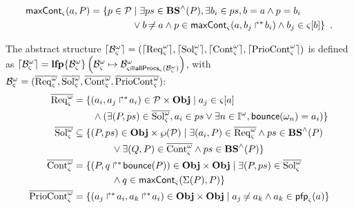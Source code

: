 \begin{definition}[$\gCont_\ctx : \Sigma \times \Obj \mapsto \powerset(\Proc)$]
  \label{def:maxCont}
  \begin{align*}
    \mathsf{maxCont}_\varsigma(a,P) = 
    \{ p \in \mathcal{P} &\mid \exists ps \in \mathbf{BS}^\wedge(P), \exists b_i \in ps, b = a \wedge p = b_i \\
      & \vee b \not\nobreak\mkern -2mu = a \wedge p \in \mathsf{maxCont}_\varsigma(a, \mbox{$b_j\Rsh^*\!b_i$}) \wedge b_j \in {\varsigma[b]} \}
    \enspace.
  \end{align*}
\end{definition}

\begin{definition}
  \label{def:aS}
  The abstract structure $\lceil \mathcal{B}_\varsigma^\omega\rceil=(\lceil \mathrm{Req}^\omega_\varsigma\rceil,\lceil \mathrm{Sol}^\omega_\varsigma\rceil,\lceil \mathrm{Cont}^\omega_\varsigma\rceil,\lceil \mathrm{PrioCont}^\omega_\varsigma\rceil)$ is defined as
  $
  \lceil \mathcal{B}_\varsigma^\omega\rceil = \mathbf{lfp}\{\mathcal{B}^\omega_\varsigma\}\left(\mathcal{B}^\omega_\varsigma\mapsto\mathcal{B}^\omega_{\varsigma \Cap \mathsf{allProcs}_\varsigma(\mathcal{B}^\omega_\varsigma)}\right)
  $,
  with $\mathcal{B}^\omega_\varsigma=(\overline{\mathrm{Req}^\omega_\varsigma},\overline{\mathrm{Sol}^\omega_\varsigma},\overline{\mathrm{Cont}^\omega_\varsigma},\overline{\mathrm{PrioCont}^\omega_\varsigma})$:
  \begin{align*}
    \myreq &= \{ (a_i,\PHobjp{a}{j}{i}) \in \PHproc \times \Obj \mid
      a_j \in \PHget{\ctx}{a} \\ %
      & \qquad \wedge (\exists (P,ps) \in \mysol, a_i \in ps \vee \exists n \in \indexes{\w}, \PHbounce(\w_n)=a_i) \}
    \\
    \mysol &\subseteq \{ (P,ps) \in \Obj \times \powerset(\PHproc) \mid
            \exists (a_i, P) \in \myreq \wedge ps \in \aBS(P) \\
      & \qquad\qquad \vee \exists (Q, P) \in \mycont \wedge ps \in \aBS(P) \}
    \\
    \mycont & = \{ (P, \PHobj{q}{\PHbounce(P)}) \in \Obj \times \Obj \mid
      \exists (P, ps) \in \mysol \\
      & \qquad\qquad \wedge q \in \gCont_\ctx(\PHsort(P),P) \}
    \\
    \mysat & = \{ (\PHobjp{a}{j}{i}, \PHobjp{a}{k}{i}) \in \Obj \times \Obj \mid
      a_j \neq a_k \wedge a_k \in \pfp_\ctx(a) \}
  \end{align*}
\end{definition}

